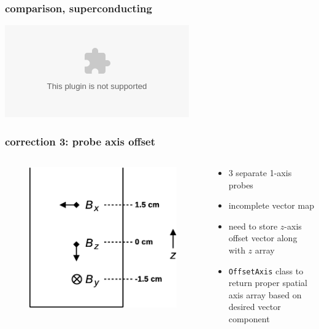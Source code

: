 \documentclass[handout]{beamer}
\newcommand{\pyplot}{\includegraphics[width=\textwidth, trim=60px 60px 60px 40px]}
\begin{document}
\begin{frame}
\frametitle{comparison, superconducting}

    \begin{center}
    \pyplot{../savedplots/endcapOneBetter.eps}
    \end{center}

\end{frame}

%
%

\begin{frame}
\frametitle{correction 3: probe axis offset}


    \begin{columns}
    
    \begin{column}{0.5\textwidth}
    \begin{figure}
    \includegraphics[width=\textwidth]
    {figures/probe.eps}
    \end{figure}
    \end{column}
    
    \begin{column}{0.5\textwidth}
    \begin{itemize}
        \item 3 separate 1-axis probes \pause
        \item incomplete vector map \pause
        \item need to store $z$-axis offset vector along with $z$ array \pause
        \item \texttt{OffsetAxis} class to return proper spatial axis array based
        on desired vector component
    \end{itemize}
    \end{column}
   


\end{columns}
\end{frame}
\end{document}
